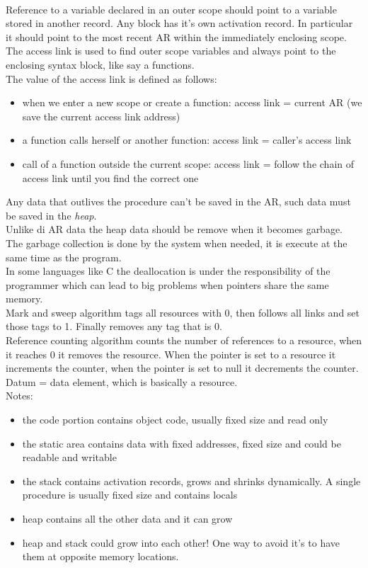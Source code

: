 \documentclass[12pt]{article}
\begin{document}
\\ Reference to a variable declared in an outer scope should point to a variable stored in another record. Any block has it's own activation record.
In particular it should point to the most recent AR within the immediately enclosing scope. 
\\ The access link is used to find outer scope variables and always point to the enclosing syntax block, like say a functions.
\\ The value of the access link is defined as follows: 
\begin{itemize}
    \item when we enter a new scope or create a function: access link = current AR (we save the current access link address)
    \item a function calls herself or another function: access link = caller's access link
    \item call of a function outside the current scope: access link = follow the chain of access link until you find the correct one
\end{itemize}
Any data that outlives the procedure can't be saved in the AR, such data must be saved in the \emph{heap}.
\\ Unlike di AR data the heap data should be remove when it becomes garbage. The garbage collection is done by the system when needed, it is execute at the same time as the program.
\\ In some languages like C the deallocation is under the responsibility of the programmer which can lead to big problems when pointers share the same memory.
\vspace{4mm} 
\\ Mark and sweep algorithm tags all resources with 0, then follows all links and set those tags to 1.
Finally removes any tag that is 0.
\vspace{4mm} 
\\ Reference counting algorithm counts the number of references to a resource, when it reaches 0 it removes the resource. 
When the pointer is set to a resource it increments the counter, when the pointer is set to null it decrements the counter.
\\ Datum = data element, which is basically a resource.
\vspace{4mm} 
\\ Notes:
\begin{itemize}
    \item the code portion contains object code, usually fixed size and read only
    \item the static area contains data with fixed addresses, fixed size and could be readable and writable
    \item the stack contains activation records, grows and shrinks dynamically. A single procedure is usually fixed size and contains locals
    \item heap contains all the other data and it can grow
    \item heap and stack could grow into each other! One way to avoid it's to have them at opposite memory locations.
\end{itemize}
\end{document}
